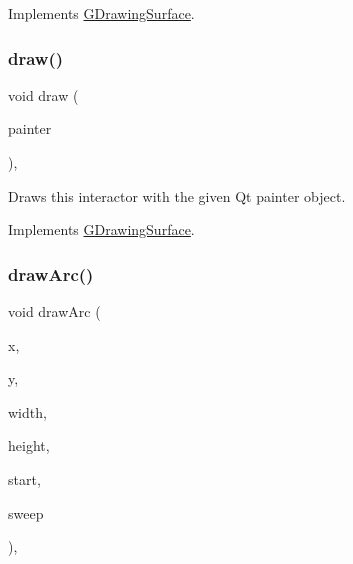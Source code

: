 Implements \mbox{\hyperlink{classsgl_1_1GDrawingSurface_ae65b7cc9bdfbc1bd01bec80ba83aab47}{G\+Drawing\+Surface}}.

\mbox{\label{classsgl_1_1GCanvas_ab4536ea39f3b3899136554bdd5bda581}} 
\subsubsection{\texorpdfstring{draw()}{draw()}\hspace{0.1cm}{\footnotesize\ttfamily [5/5]}}
{\footnotesize\ttfamily void draw (\begin{DoxyParamCaption}\item[{Q\+Painter $\ast$}]{painter }\end{DoxyParamCaption})\hspace{0.3cm}{\ttfamily [override]}, {\ttfamily [virtual]}}



Draws this interactor with the given Qt painter object. 



Implements \mbox{\hyperlink{classsgl_1_1GDrawingSurface}{G\+Drawing\+Surface}}.

\mbox{\label{classsgl_1_1GDrawingSurface_a38b6fae1045191c57092b49905068144}} 
\subsubsection{\texorpdfstring{draw\+Arc()}{drawArc()}}
{\footnotesize\ttfamily void draw\+Arc (\begin{DoxyParamCaption}\item[{double}]{x,  }\item[{double}]{y,  }\item[{double}]{width,  }\item[{double}]{height,  }\item[{double}]{start,  }\item[{double}]{sweep }\end{DoxyParamCaption})\hspace{0.3cm}{\ttfamily [virtual]}, {\ttfamily [inherited]}}



